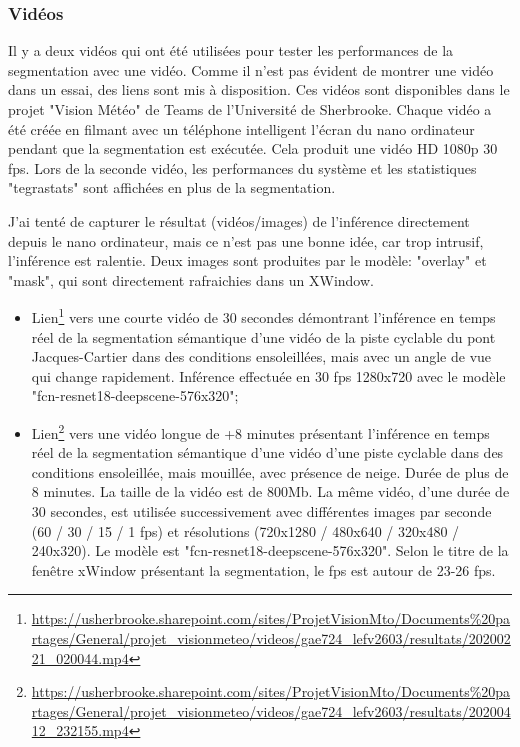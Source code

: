 \subsubsection{Vidéos}
\par Il y a deux vidéos qui ont été utilisées pour tester les performances de la segmentation avec une vidéo. Comme il n'est pas évident de montrer une vidéo dans un essai, des liens sont mis à disposition. Ces vidéos sont disponibles dans le projet "Vision Météo" de Teams de l'Université de Sherbrooke. Chaque vidéo a été créée en filmant avec un téléphone intelligent l'écran du nano ordinateur pendant que la segmentation est exécutée. Cela produit une vidéo HD 1080p 30 \acrshort{fps}. Lors de la seconde vidéo, les performances du système et les statistiques "tegrastats" sont affichées en plus de la segmentation.
\par J'ai tenté de capturer le résultat (vidéos/images) de l'inférence directement depuis le nano ordinateur, mais ce n'est pas une bonne idée, car trop intrusif, l'inférence est ralentie. Deux images sont produites par le modèle: "overlay" et "mask", qui sont directement rafraichies dans un XWindow. 
\begin{itemize}
   \item Lien\footnote{\url{https://usherbrooke.sharepoint.com/sites/ProjetVisionMto/Documents\%20partages/General/projet_visionmeteo/videos/gae724_lefv2603/resultats/20200221_020044.mp4}} vers une courte vidéo de 30 secondes démontrant l'inférence en temps réel de la segmentation sémantique d'une vidéo de la piste cyclable du pont Jacques-Cartier dans des conditions ensoleillées, mais avec un angle de vue qui change rapidement. Inférence effectuée en 30 \acrshort{fps} 1280x720 avec le modèle "fcn-resnet18-deepscene-576x320";
   \item Lien\footnote{\url{https://usherbrooke.sharepoint.com/sites/ProjetVisionMto/Documents\%20partages/General/projet_visionmeteo/videos/gae724_lefv2603/resultats/20200412_232155.mp4}} vers une vidéo longue de +8 minutes présentant l'inférence en temps réel de la segmentation sémantique d'une vidéo d'une piste cyclable dans des conditions ensoleillée, mais mouillée, avec présence de neige. Durée de plus de 8 minutes. La taille de la vidéo est de 800Mb. La même vidéo, d'une durée de 30 secondes, est utilisée successivement avec différentes images par seconde (60 / 30 / 15 / 1 \acrshort{fps}) et résolutions (720x1280 / 480x640 / 320x480 / 240x320). Le modèle est "fcn-resnet18-deepscene-576x320". Selon le titre de la fenêtre xWindow présentant la segmentation, le \acrshort{fps} est autour de 23-26 \acrshort{fps}.
\end{itemize}
